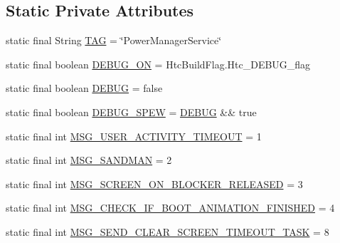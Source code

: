 \subsection*{Static Private Attributes}
\begin{DoxyCompactItemize}
\item 
static final String \hyperlink{classcom_1_1android_1_1server_1_1power_1_1PowerManagerService_a295d19078e6db3689fe23a04e2da2cfb}{T\-A\-G} = \char`\"{}Power\-Manager\-Service\char`\"{}
\item 
static final boolean \hyperlink{classcom_1_1android_1_1server_1_1power_1_1PowerManagerService_ae88b7d0affc4e24c6151967ab3fe29cd}{D\-E\-B\-U\-G\-\_\-\-O\-N} = Htc\-Build\-Flag.\-Htc\-\_\-\-D\-E\-B\-U\-G\-\_\-flag
\item 
static final boolean \hyperlink{classcom_1_1android_1_1server_1_1power_1_1PowerManagerService_a4e589f87f71f8a58be8e9eb0a2d4d092}{D\-E\-B\-U\-G} = false
\item 
static final boolean \hyperlink{classcom_1_1android_1_1server_1_1power_1_1PowerManagerService_ada98083f665ee411e11fef30ec1f2cc7}{D\-E\-B\-U\-G\-\_\-\-S\-P\-E\-W} = \hyperlink{classcom_1_1android_1_1server_1_1power_1_1PowerManagerService_a4e589f87f71f8a58be8e9eb0a2d4d092}{D\-E\-B\-U\-G} \&\& true
\item 
static final int \hyperlink{classcom_1_1android_1_1server_1_1power_1_1PowerManagerService_a4fed9e7362e49036dc9cb4915e1558b4}{M\-S\-G\-\_\-\-U\-S\-E\-R\-\_\-\-A\-C\-T\-I\-V\-I\-T\-Y\-\_\-\-T\-I\-M\-E\-O\-U\-T} = 1
\item 
static final int \hyperlink{classcom_1_1android_1_1server_1_1power_1_1PowerManagerService_a0e7d086a80e11b64a30e23b6cd164220}{M\-S\-G\-\_\-\-S\-A\-N\-D\-M\-A\-N} = 2
\item 
static final int \hyperlink{classcom_1_1android_1_1server_1_1power_1_1PowerManagerService_aa24ecb340d5101f2670b75ed4f697d77}{M\-S\-G\-\_\-\-S\-C\-R\-E\-E\-N\-\_\-\-O\-N\-\_\-\-B\-L\-O\-C\-K\-E\-R\-\_\-\-R\-E\-L\-E\-A\-S\-E\-D} = 3
\item 
static final int \hyperlink{classcom_1_1android_1_1server_1_1power_1_1PowerManagerService_a74126ba60f9b7c047dc7a5d57fdc7139}{M\-S\-G\-\_\-\-C\-H\-E\-C\-K\-\_\-\-I\-F\-\_\-\-B\-O\-O\-T\-\_\-\-A\-N\-I\-M\-A\-T\-I\-O\-N\-\_\-\-F\-I\-N\-I\-S\-H\-E\-D} = 4
\item 
static final int \hyperlink{classcom_1_1android_1_1server_1_1power_1_1PowerManagerService_a432ff8a51f91deb76a4e5eea8358a9e3}{M\-S\-G\-\_\-\-S\-E\-N\-D\-\_\-\-C\-L\-E\-A\-R\-\_\-\-S\-C\-R\-E\-E\-N\-\_\-\-T\-I\-M\-E\-O\-U\-T\-\_\-\-T\-A\-S\-K} = 8

\end{DoxyCompactItemize}
